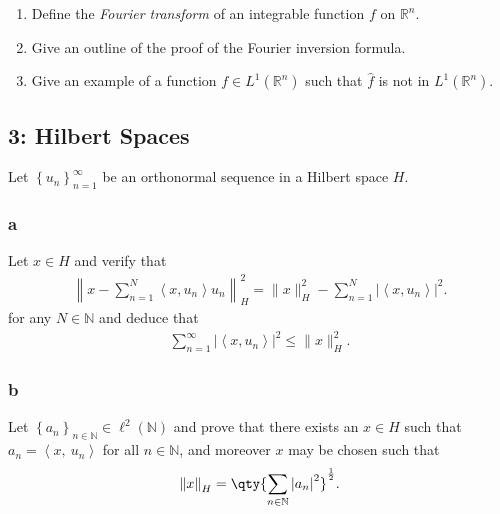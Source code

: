 \begin{enumerate}
\def\labelenumi{\arabic{enumi}.}
\tightlist
\item
  Define the \emph{Fourier transform} of an integrable function \(f\) on
  \({\mathbb{R}}^n\).
\item
  Give an outline of the proof of the Fourier inversion formula.
\item
  Give an example of a function \(f\in L^1({\mathbb{R}}^n)\) such that
  \(\widehat{f}\) is not in \(L^1({\mathbb{R}}^n)\).
\end{enumerate}

\hypertarget{hilbert-spaces}{%
\subsection{3: Hilbert Spaces}\label{hilbert-spaces}}

Let \(\left\{{u_n}\right\}_{n=1}^\infty\) be an orthonormal sequence in
a Hilbert space \(H\).

\hypertarget{a-2}{%
\subsubsection{a}\label{a-2}}

Let \(x\in H\) and verify that
\begin{align*} \left\|x-\sum_{n=1}^{N}\left\langle x, u_{n}\right\rangle u_{n}\right\|_H^{2} = \|x\|_H^{2}-\sum_{n=1}^{N}\left|\left\langle x, u_{n}\right\rangle\right|^{2} .\end{align*}
for any \(N\in {\mathbb{N}}\) and deduce that
\begin{align*} \sum_{n=1}^{\infty}\left|\left\langle x, u_{n}\right\rangle\right|^{2} \leq\|x\|_H^{2} .\end{align*}

\hypertarget{b-2}{%
\subsubsection{b}\label{b-2}}

Let
\(\left\{{a_n}\right\}_{n\in {\mathbb{N}}} \in \ell^2({\mathbb{N}})\)
and prove that there exists an \(x\in H\) such that
\(a_n = {\left\langle {x},~{u_n} \right\rangle}\) for all
\(n\in {\mathbb{N}}\), and moreover \(x\) may be chosen such that
\begin{align*} {\left\lVert {x} \right\rVert}_H = \qty{ \sum_{n\in {\mathbb{N}}} {\left\lvert {a_n} \right\rvert}^2}^{1\over 2} .\end{align*}

